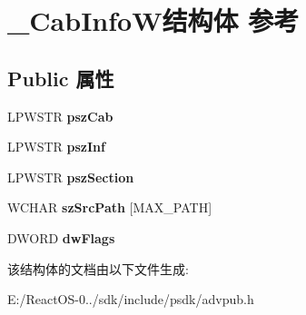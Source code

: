 \hypertarget{struct___cab_info_w}{}\section{\+\_\+\+Cab\+Info\+W结构体 参考}
\label{struct___cab_info_w}
\subsection*{Public 属性}
\begin{DoxyCompactItemize}
\item 
\mbox{\label{struct___cab_info_w_abf11ee3b6899865b53c93550d14b355e}} 
L\+P\+W\+S\+TR {\bfseries psz\+Cab}
\item 
\mbox{\label{struct___cab_info_w_adc939f8c24e9706d03f8fdc3baf9e8ed}} 
L\+P\+W\+S\+TR {\bfseries psz\+Inf}
\item 
\mbox{\label{struct___cab_info_w_a77e683f6bcb56e2988ce2d69fac725ed}} 
L\+P\+W\+S\+TR {\bfseries psz\+Section}
\item 
\mbox{\label{struct___cab_info_w_ab26c4ec16bc93cff78e0be0dd813829b}} 
W\+C\+H\+AR {\bfseries sz\+Src\+Path} \mbox{[}M\+A\+X\+\_\+\+P\+A\+TH\mbox{]}
\item 
\mbox{\label{struct___cab_info_w_ae408b0a67c5638603f4ddd7fa0196c69}} 
D\+W\+O\+RD {\bfseries dw\+Flags}
\end{DoxyCompactItemize}


该结构体的文档由以下文件生成\+:\begin{DoxyCompactItemize}
\item 
E\+:/\+React\+O\+S-\/0../sdk/include/psdk/advpub.\+h\end{DoxyCompactItemize}
